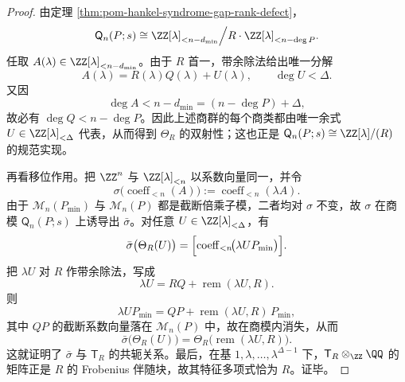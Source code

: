 \begin{proof}
由定理 \ref{thm:pom-hankel-syndrome-gap-rank-defect}，
\[
\mathsf Q_n(P;s)
\cong
\ZZ[\lambda]_{<n-d_{\min}}\Big/ R\cdot \ZZ[\lambda]_{<n-\deg P}.
\]
任取 \(A(\lambda)\in \ZZ[\lambda]_{<n-d_{\min}}\)。由于 \(R\) 首一，带余除法给出唯一分解
\[
A(\lambda)=R(\lambda)Q(\lambda)+U(\lambda),
\qquad
\deg U<\Delta.
\]
又因
\[
\deg A<n-d_{\min}=(n-\deg P)+\Delta,
\]
故必有 \(\deg Q<n-\deg P\)。因此上述商群的每个商类都由唯一余式 \(U\in \ZZ[\lambda]_{<\Delta}\) 代表，从而得到 \(\Theta_R\) 的双射性；这也正是
\(
\mathsf Q_n(P;s)\cong \ZZ[\lambda]/(R)
\)
的规范实现。

再看移位作用。把 \(\ZZ^n\) 与 \(\ZZ[\lambda]_{<n}\) 以系数向量同一，并令
\[
\sigma\bigl(\operatorname{coeff}_{<n}(A)\bigr):=
\operatorname{coeff}_{<n}(\lambda A).
\]
由于 \(\mathcal M_n(P_{\min})\) 与 \(\mathcal M_n(P)\) 都是截断倍乘子模，二者均对 \(\sigma\) 不变，故 \(\sigma\) 在商模 \(\mathsf Q_n(P;s)\) 上诱导出 \(\bar\sigma\)。对任意 \(U\in\ZZ[\lambda]_{<\Delta}\)，有
\[
\bar\sigma\bigl(\Theta_R(U)\bigr)
=
\Bigl[\operatorname{coeff}_{<n}\!\bigl(\lambda U P_{\min}\bigr)\Bigr].
\]
把 \(\lambda U\) 对 \(R\) 作带余除法，写成
\[
\lambda U=R Q+\operatorname{rem}(\lambda U,R).
\]
则
\[
\lambda U P_{\min}
=
Q P + \operatorname{rem}(\lambda U,R)\,P_{\min},
\]
其中 \(Q P\) 的截断系数向量落在 \(\mathcal M_n(P)\) 中，故在商模内消失，从而
\[
\bar\sigma\bigl(\Theta_R(U)\bigr)
=
\Theta_R\!\bigl(\operatorname{rem}(\lambda U,R)\bigr).
\]
这就证明了 \(\bar\sigma\) 与 \(\mathsf T_R\) 的共轭关系。最后，在基
\(
1,\lambda,\dots,\lambda^{\Delta-1}
\)
下，\(\mathsf T_R\otimes_{\ZZ}\QQ\) 的矩阵正是 \(R\) 的 Frobenius 伴随块，故其特征多项式恰为 \(R\)。证毕。
\end{proof}

